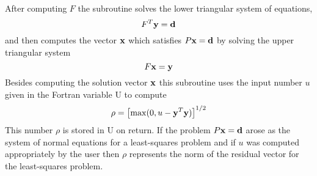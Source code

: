\documentclass[twoside]{MATH77}
\begin{document}
After computing $F$ the subroutine solves the lower triangular system of
equations,%
\begin{equation*}
F^T{\bf y}={\bf d}
\end{equation*}
and then computes the vector ${\bf x}$ which satisfies $P{\bf x}={\bf d}$ by
solving the upper triangular system%
\begin{equation*}
F{\bf x}={\bf y}
\end{equation*}
Besides computing the solution vector ${\bf x}$ this subroutine uses the
input number $u$ given in the Fortran variable U to compute
\begin{equation}
\label{O6}\rho =\left[ \max (0,u-{\bf y}^T{\bf y})\right] ^{1/2}
\end{equation}
This number $\rho $ is stored in U on return. If the problem $P{\bf x}={\bf d%
}$ arose as the system of normal equations for a least-squares problem and
if $u$ was computed appropriately by the user then $\rho $ represents the
norm of the residual vector for the least-squares problem.
\end{document}
